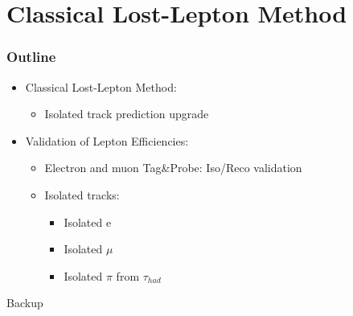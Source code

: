 \documentclass{beamer}
\begin{document}
\section{Classical Lost-Lepton Method}
\begin{frame}
 \frametitle{Outline}
 \begin{itemize}
  \item Classical Lost-Lepton Method:
  \begin{itemize}
   \item Isolated track prediction upgrade
  \end{itemize}
  \item Validation of Lepton Efficiencies:
  \begin{itemize}
   \item Electron and muon Tag\&Probe: Iso/Reco validation
   \item Isolated tracks:
   \begin{itemize}
    \item Isolated e
    \item Isolated $\mu$
    \item Isolated $\pi$ from $\tau_{had}$
   \end{itemize}
  \end{itemize}
 \end{itemize}
\end{frame}

\begin{frame}
 \begin{block}{}
 \centering
 \Large Backup
 \end{block}
\end{frame}
\end{document}
